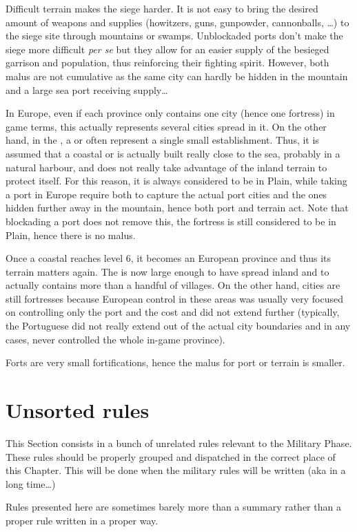 \begin{designnote}
  Difficult terrain makes the siege harder. It is not easy to bring the
  desired amount of weapons and supplies (howitzers, guns, gunpowder,
  cannonballs, \ldots) to the siege site through mountains or
  swamps. Unblockaded ports don't make the siege more difficult \emph{per se}
  but they allow for an easier supply of the besieged garrison and population,
  thus reinforcing their fighting spirit. However, both malus are not
  cumulative as the same city can hardly be hidden in the mountain and a large
  sea port receiving supply\ldots

  \smallskip

  In Europe, even if each province only contains one city (hence one fortress)
  in game terms, this actually represents several cities spread in it. On the
  other hand, in the \ROTW, a \COL or \TP often represent a single small
  establishment. Thus, it is assumed that a coastal \COL or \TP is actually
  built really close to the sea, probably in a natural harbour, and does not
  really take advantage of the inland terrain to protect itself. For this
  reason, it is always considered to be in Plain, while taking a port in
  Europe require both to capture the actual port cities and the ones hidden
  further away in the mountain, hence both port and terrain act. Note that
  blockading a \ROTW port does not remove this, the fortress is still
  considered to be in Plain, hence there is no malus.

  Once a coastal \COL reaches level 6, it becomes an European province and
  thus its terrain matters again. The \COL is now large enough to have spread
  inland and to actually contains more than a handful of villages. On the
  other hand, \ROTW cities are still \ROTW fortresses because European control
  in these areas was usually very focused on controlling only the port and the
  cost and did not extend further (typically, the Portuguese
   did not really extend out of the actual city boundaries
  and in any cases, never controlled the whole in-game province).

  Forts are very small fortifications, hence the malus for port or terrain is
  smaller.
\end{designnote}

\section{Unsorted rules}
\begin{designnote}
  This Section consists in a bunch of unrelated rules relevant to the Military
  Phase. These rules should be properly grouped and dispatched in the correct
  place of this Chapter. This will be done when the military rules will be
  written (aka in a long time\ldots)

  Rules presented here are sometimes barely more than a summary rather than a
  proper rule written in a proper way.
\end{designnote}

